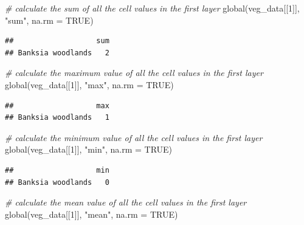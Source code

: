 \documentclass[
  12pt,
]{book}
\newenvironment{Shaded}{\begin{snugshade}}{\end{snugshade}}
\newcommand{\AttributeTok}[1]{\textcolor[rgb]{0.77,0.63,0.00}{#1}}
\newcommand{\CommentTok}[1]{\textcolor[rgb]{0.56,0.35,0.01}{\textit{#1}}}
\newcommand{\ConstantTok}[1]{\textcolor[rgb]{0.00,0.00,0.00}{#1}}
\newcommand{\DecValTok}[1]{\textcolor[rgb]{0.00,0.00,0.81}{#1}}
\newcommand{\FunctionTok}[1]{\textcolor[rgb]{0.00,0.00,0.00}{#1}}
\newcommand{\NormalTok}[1]{#1}
\newcommand{\StringTok}[1]{\textcolor[rgb]{0.31,0.60,0.02}{#1}}
\begin{document}
\begin{Shaded}
\begin{Highlighting}[]
\CommentTok{\# calculate the sum of all the cell values in the first layer}
\FunctionTok{global}\NormalTok{(veg\_data[[}\DecValTok{1}\NormalTok{]], }\StringTok{"sum"}\NormalTok{, }\AttributeTok{na.rm =} \ConstantTok{TRUE}\NormalTok{)}
\end{Highlighting}
\end{Shaded}

\begin{verbatim}
##                   sum
## Banksia woodlands   2
\end{verbatim}

\begin{Shaded}
\begin{Highlighting}[]
\CommentTok{\# calculate the maximum value of all the cell values in the first layer}
\FunctionTok{global}\NormalTok{(veg\_data[[}\DecValTok{1}\NormalTok{]], }\StringTok{"max"}\NormalTok{, }\AttributeTok{na.rm =} \ConstantTok{TRUE}\NormalTok{)}
\end{Highlighting}
\end{Shaded}

\begin{verbatim}
##                   max
## Banksia woodlands   1
\end{verbatim}

\begin{Shaded}
\begin{Highlighting}[]
\CommentTok{\# calculate the minimum value of all the cell values in the first layer}
\FunctionTok{global}\NormalTok{(veg\_data[[}\DecValTok{1}\NormalTok{]], }\StringTok{"min"}\NormalTok{, }\AttributeTok{na.rm =} \ConstantTok{TRUE}\NormalTok{)}
\end{Highlighting}
\end{Shaded}

\begin{verbatim}
##                   min
## Banksia woodlands   0
\end{verbatim}

\begin{Shaded}
\begin{Highlighting}[]
\CommentTok{\# calculate the mean value of all the cell values in the first layer}
\FunctionTok{global}\NormalTok{(veg\_data[[}\DecValTok{1}\NormalTok{]], }\StringTok{"mean"}\NormalTok{, }\AttributeTok{na.rm =} \ConstantTok{TRUE}\NormalTok{)}
\end{Highlighting}
\end{Shaded}
\end{document}
